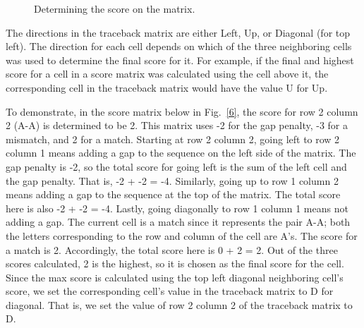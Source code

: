 \documentclass[conference]{IEEEtran}
\begin{document}
\begin{figure}[htbp]
\centerline{}
\caption{Determining the score on the matrix. \cite{vladimir}}
\label{5}
\end{figure}

The directions in the traceback matrix are either Left, Up, or Diagonal (for top left). The direction for each cell depends on which of the three neighboring cells was used to determine the final score for it. For example, if the final and highest score for a cell in a score matrix was calculated using the cell above it, the corresponding cell in the traceback matrix would have the value U for Up.

To demonstrate, in the score matrix below in Fig.~\ref{6}, the score for row 2 column 2 (A-A) is determined to be 2. This matrix uses -2 for the gap penalty, -3 for a mismatch, and 2 for a match. Starting at row 2 column 2, going left to row 2 column 1 means adding a gap to the sequence on the left side of the matrix. The gap penalty is -2, so the total score for going left is the sum of the left cell and the gap penalty. That is, -2 + -2 = -4. Similarly, going up to row 1 column 2 means adding a gap to the sequence at the top of the matrix. The total score here is also -2 + -2 = -4. Lastly, going diagonally to row 1 column 1 means not adding a gap. The current cell is a match since it represents the pair A-A; both the letters corresponding to the row and column of the cell are A’s. The score for a match is 2. Accordingly, the total score here is 0 + 2 = 2. Out of the three scores calculated, 2 is the highest, so it is chosen as the final score for the cell. Since the max score is calculated using the top left diagonal neighboring cell’s score, we set the corresponding cell’s value in the traceback matrix to D for diagonal. That is, we set the value of row 2 column 2 of the traceback matrix to D.
\end{document}
